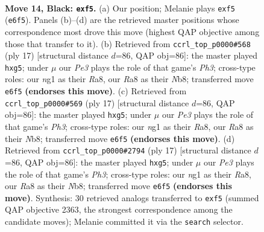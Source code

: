 \documentclass[11pt]{article}
\begin{document}
\clearpage

\begin{figure}[p]\centering
\begin{subfigure}{0.46\textwidth}\centering
\resizebox{\linewidth}{!}{%
\newchessgame
\chessboard[
  setfen={rnq1kb1r/p4pp1/4pn1p/1pP2N1P/p2P1P2/8/6P1/R1BQKBNR b KQkq - 0 14},
  showmover=false,
  pgfstyle=straightmove, color=movearrow, markmove={e6-f5}
]}
\caption{}
\end{subfigure}\hfill
\begin{subfigure}{0.46\textwidth}\centering
\resizebox{\linewidth}{!}{%
\newchessgame
\chessboard[
  setfen={rnbqkb1r/p4p2/2p1pn1p/1p2P1N1/2pP3B/2N5/PP3PPP/R2QKB1R b KQkq - 0 9},
  showmover=false,
  pgfstyle=straightmove, color=movearrow, markmove={h6-g5}
]}
\caption{}
\end{subfigure}
\\[4pt]
\begin{subfigure}{0.46\textwidth}\centering
\resizebox{\linewidth}{!}{%
\newchessgame
\chessboard[
  setfen={rnbqkb1r/p4p2/2p1pn1p/1p2P1N1/2pP3B/2N5/PP3PPP/R2QKB1R b KQkq - 0 9},
  showmover=false,
  pgfstyle=straightmove, color=movearrow, markmove={h6-g5}
]}
\caption{}
\end{subfigure}\hfill
\begin{subfigure}{0.46\textwidth}\centering
\resizebox{\linewidth}{!}{%
\newchessgame
\chessboard[
  setfen={rnbqkb1r/p4p2/2p1pn1p/1p2P1N1/2pP3B/2N5/PP3PPP/R2QKB1R b KQkq - 0 9},
  showmover=false,
  pgfstyle=straightmove, color=movearrow, markmove={h6-g5}
]}
\caption{}
\end{subfigure}
\caption{\textbf{Move 14, Black: \texttt{exf5}.} (a) Our position; Melanie plays \texttt{exf5} (\texttt{e6f5}). Panels (b)--(d) are the retrieved master positions whose correspondence most drove this move (highest QAP objective among those that transfer to it). (b) Retrieved from \texttt{ccrl\_top\_p0000\#568} (ply 17) [structural distance $d$=86, QAP obj=86]: the master played \texttt{hxg5}; under $\mu$ our \emph{Pe3} plays the role of that game's \emph{Ph3}; cross-type roles: our \emph{n}g1 as their \emph{R}a8, our \emph{R}a8 as their \emph{N}b8; transferred move \texttt{e6f5} \textbf{(endorses this move)}. (c) Retrieved from \texttt{ccrl\_top\_p0000\#569} (ply 17) [structural distance $d$=86, QAP obj=86]: the master played \texttt{hxg5}; under $\mu$ our \emph{Pe3} plays the role of that game's \emph{Ph3}; cross-type roles: our \emph{n}g1 as their \emph{R}a8, our \emph{R}a8 as their \emph{N}b8; transferred move \texttt{e6f5} \textbf{(endorses this move)}. (d) Retrieved from \texttt{ccrl\_top\_p0000\#2794} (ply 17) [structural distance $d$=86, QAP obj=86]: the master played \texttt{hxg5}; under $\mu$ our \emph{Pe3} plays the role of that game's \emph{Ph3}; cross-type roles: our \emph{n}g1 as their \emph{R}a8, our \emph{R}a8 as their \emph{N}b8; transferred move \texttt{e6f5} \textbf{(endorses this move)}. Synthesis: 30 retrieved analogs transferred to \texttt{exf5} (summed QAP objective 2363, the strongest correspondence among the candidate moves); Melanie committed it via the \texttt{search} selector.}
\label{fig:thought-m27}
\end{figure}
\end{document}
